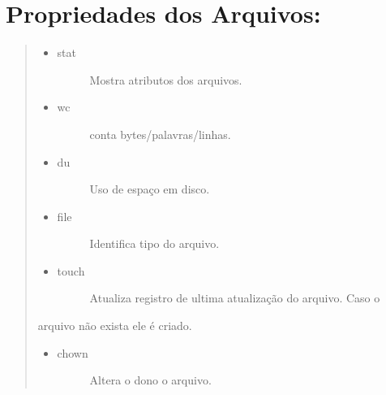 \documentclass[a4paper,10pt,brazil]{sphinxmanual}
\begin{document}
\section{Propriedades dos Arquivos:}
\label{unix:propriedades-dos-arquivos}\begin{quote}
\begin{itemize}
\item {} \begin{description}
\item[{stat}] \leavevmode
Mostra atributos dos arquivos.

\end{description}

\item {} \begin{description}
\item[{wc}] \leavevmode
conta bytes/palavras/linhas.

\end{description}

\item {} \begin{description}
\item[{du}] \leavevmode
Uso de espaço em disco.

\end{description}

\item {} \begin{description}
\item[{file}] \leavevmode
Identifica tipo do arquivo.

\end{description}

\item {} \begin{description}
\item[{touch}] \leavevmode
Atualiza registro de ultima atualização do arquivo. Caso o

\end{description}

\end{itemize}

arquivo não exista ele é criado.
\begin{itemize}
\item {} \begin{description}
\item[{chown}] \leavevmode
Altera o dono o arquivo.

\end{description}


\end{itemize}
\end{quote}
\end{document}
